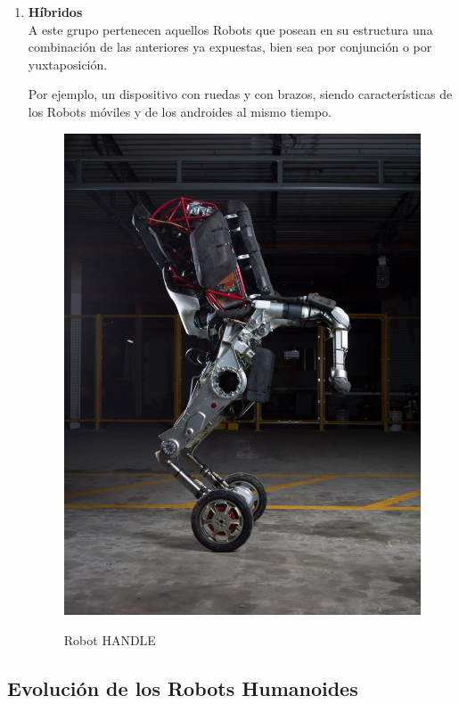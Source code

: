 \begin{enumerate}
\item \textbf{Híbridos}\\ A este grupo pertenecen aquellos Robots que posean en su estructura una combinación de las anteriores ya expuestas, bien sea por conjunción o por yuxtaposición. 

Por ejemplo, un dispositivo con ruedas y con brazos, siendo características de los Robots móviles y de los androides al mismo tiempo.

\begin{figure}[H]
\centering
{\includegraphics[scale=0.15]{imagenes/apartado_2/25_hibrido_handle_bd}}
\caption{Robot HANDLE}
\label{figura25}
\end{figure}

\end{enumerate}

\newpage

\subsection{Evolución de los Robots Humanoides}


